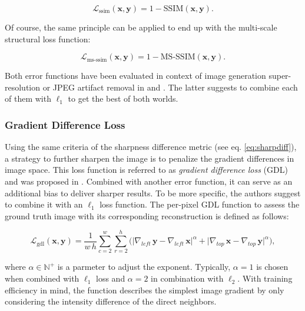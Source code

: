 \begin{equation} \label{eq:ssim}
\mathcal{L}_{\textrm{ssim}}(\textbf{x}, \textbf{y}) = 1 - \textrm{SSIM}(\textbf{x}, \textbf{y}).
\end{equation}

Of course, the same principle can be applied to end up with the multi-scale structural loss function:

\begin{equation} \label{eq:msssim}
\mathcal{L}_{\textrm{ms-ssim}}(\textbf{x}, \textbf{y}) = 1 - \textrm{MS-SSIM}(\textbf{x}, \textbf{y}).
\end{equation}

Both error functions have been evaluated in context of image generation super-resolution or JPEG artifact removal in \parencite{learning-perc-sim} and \parencite{loss-func-img-proc}. The latter suggests to combine each of them with $ \ell_1 $ to get the best of both worlds.

\subsubsection*{Gradient Difference Loss} \label{sec:gdl}

Using the same criteria of the sharpness difference metric (see eq. \ref{eq:sharpdiff}), a strategy to further sharpen the image is to penalize the gradient differences in image space. This loss function is referred to as \textit{gradient difference loss} (GDL) and was proposed in \parencite{deep_multiscale_video_pred}. Combined with another error function, it can serve as an additional bias to deliver sharper results. To be more specific, the authors suggest to combine it with an $ \ell_1 $ loss function. The per-pixel GDL function to assess the ground truth image with its corresponding reconstruction is defined as follows:

\begin{equation} \label{eq:gdl}
\mathcal{L}_{\textrm{gdl}}(\textbf{x}, \textbf{y}) = \frac{1}{w \, h} \sum_{c=2}^{w} \sum_{r=2}^{h} \Big(\big|\nabla_{left} \, \textbf{y} - \nabla_{left} \, \textbf{x}\big|^{\alpha} + \big|\nabla_{top} \, \textbf{x} - \nabla_{top} \, \textbf{y}\big|^{\alpha}\Big) ,
\end{equation}

where $ \alpha \in \mathbb{N}^{+} $ is a parmeter to adjust the exponent. Typically, $ \alpha = 1 $ is chosen when combined with $ \ell_1 $ loss and $ \alpha = 2 $ in combination with $ \ell_2 $. With training efficiency in mind, the function describes the simplest image gradient by only considering the intensity difference of the direct neighbors.

